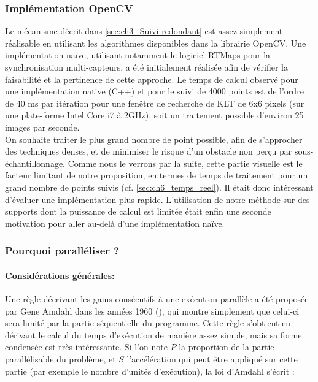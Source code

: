 \subsubsection{Implémentation OpenCV}
Le mécanisme décrit dans \ref{sec:ch3_Suivi redondant} est assez simplement réalisable en utilisant les algorithmes disponibles dans la librairie OpenCV. Une implémentation naïve, utilisant notamment le logiciel RTMaps pour la synchronisation multi-capteurs, a été initialement réalisée afin de vérifier la faisabilité et la pertinence de cette approche. Le temps de calcul observé pour une implémentation native (C++) et pour le suivi de 4000 points est de l'ordre de 40 ms par itération pour une fenêtre de recherche de KLT de 6x6 pixels (sur une plate-forme Intel Core i7 à 2GHz), soit un traitement possible d'environ 25 images par seconde. \\
On souhaite traiter le plus grand nombre de point possible, afin de s'approcher des techniques denses, et de minimiser le risque d'un obstacle non perçu par sous-échantillonnage. Comme nous le verrons par la suite, cette partie visuelle est le facteur limitant de notre proposition, en termes de temps de traitement pour un grand nombre de points suivis (cf. \ref{sec:ch6_temps_reel}). Il était donc intéressant d'évaluer une implémentation plus rapide. L'utilisation de notre méthode sur des supports dont la puissance de calcul est limitée était enfin une seconde motivation pour aller au-delà d'une implémentation naïve.

\subsubsection{Pourquoi paralléliser ?}
\paragraph{Considérations générales:\\}
Une règle décrivant les gains consécutifs à une exécution parallèle a été proposée par Gene Amdahl dans les années 1960 (\cite{Amdahl1967}), qui montre simplement que celui-ci sera limité par la partie séquentielle du programme. Cette règle s'obtient en dérivant le calcul du temps d'exécution de manière assez simple, mais sa forme condensée est très intéressante. Si l'on note $P$ la proportion de la partie parallélisable du problème, et $S$ l'accélération qui peut être appliqué sur cette partie (par exemple le nombre d'unités d'exécution), la loi d'Amdahl s'écrit :

